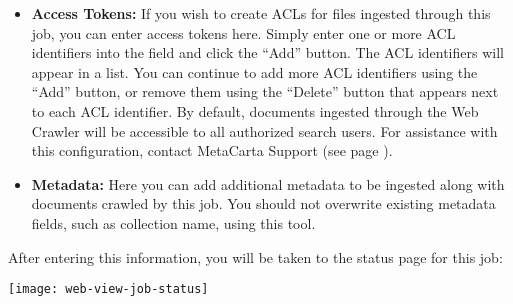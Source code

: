 \begin{itemize}

\item \textbf{Access Tokens:} If you wish to create ACLs for files
ingested through this job, you can enter access tokens here. Simply
enter one or more ACL identifiers into the field and click the ``Add''
button. The ACL identifiers will appear in a list. You can continue to add
more ACL identifiers using the ``Add'' button, or remove them using the
``Delete'' button that appears next to each ACL identifier. By default,
documents ingested through the Web Crawler will be accessible to all
authorized search users. For assistance with this configuration, contact
MetaCarta Support (see page \pageref{SupportContact}).


\end{itemize}




\begin{itemize}

\item \textbf{Metadata:} Here you can add additional metadata to be ingested along with documents crawled by this job. You should not overwrite existing metadata fields, such as collection name, using this tool.

\end{itemize}

After entering this information, you will be taken to the status page
for this job:

\texttt{[image: web-view-job-status]}
